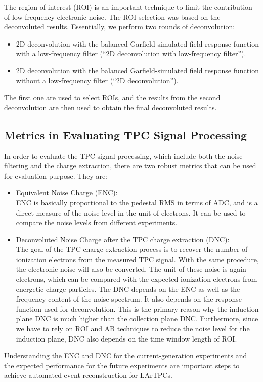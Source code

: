 The region of interest (ROI) is an important technique to limit the contribution of low-frequency 
electronic noise. The ROI selection was based on the deconvoluted results. Essentially, we perform
two rounds of deconvolution:
\begin{itemize}
\item 2D deconvolution with the balanced Garfield-simulated field response function with a low-frequency filter (``2D deconvolution with low-frequency filter'').
\item 2D deconvolution with the balanced Garfield-simulated field response function without a low-frequency filter (``2D deconvolution'').
\end{itemize}
The first one are used to select ROIs, and the results from the second deconvolution are then 
used to obtain the final deconvoluted results. 

\subsection{Metrics in Evaluating TPC Signal Processing}

In order to evaluate the TPC signal processing, which include both the noise filtering and 
the charge extraction, there are two robust metrics that can be used for evaluation 
purpose. They are:
\begin{itemize}
\item Equivalent Noise Charge (ENC): \\
  ENC is  basically proportional to the pedestal RMS in terms of ADC, and is a direct 
measure of the noise level in the unit of electrons. It can be used to compare the 
noise levels from different experiments.
\item Deconvoluted Noise Charge after the TPC charge extraction (DNC): \\
The goal of the TPC charge extraction process is to recover the number of ionization 
electrons from the measured TPC signal. With the same procedure, the electronic noise
will also be converted. The unit of these noise is again electrons, which can be compared with 
the expected ionization electrons from energetic charge particles. 
The DNC depends on the ENC as well as the frequency content of the noise spectrum. It
also depends on the response function used for deconvolution. This is the primary reason 
why the induction plane DNC is much higher than the collection plane DNC. Furthermore, since
we have to rely on ROI and AB techniques to reduce the noise level for the induction plane,
DNC also depends on the time window length of ROI. 
\end{itemize}
Understanding the ENC and DNC for the current-generation experiments and the expected 
performance for the future experiments are important steps to achieve automated event 
reconstruction for LArTPCs.

